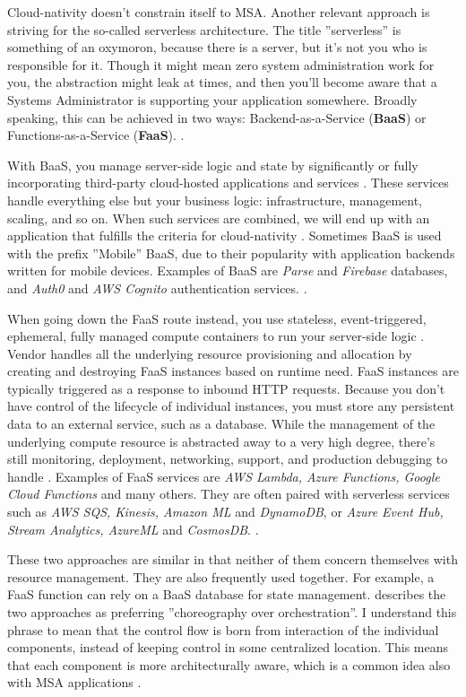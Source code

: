\documentclass[utf8,english]{gradu3}
\begin{document}
Cloud-nativity doesn't constrain itself to MSA. Another relevant approach is
striving for the so-called serverless architecture. The title
''serverless'' is something of an oxymoron, because there is a server, but it's
not you who is responsible for it. Though it might mean zero system
administration work for you, the abstraction might leak at times, and then
you'll become aware that a Systems Administrator is supporting your application
somewhere. Broadly speaking, this can be achieved in two ways:
Backend-as-a-Service (\textbf{BaaS}) or Functions-as-a-Service (\textbf{FaaS}).
\parencite{Roberts2018}.

With BaaS, you manage server-side logic and state by significantly or fully
incorporating third-party cloud-hosted applications and services
\parencite{Roberts2018}.  These services handle everything else but your
business logic: infrastructure, management, scaling, and so on. When such
services are combined, we will end up with an application that fulfills the
criteria for cloud-nativity \parencite[20]{Gannon2017}. Sometimes BaaS is used
with the prefix ''Mobile'' BaaS, due to their popularity with application
backends written for mobile devices. Examples of BaaS are \textit{Parse} and
\textit{Firebase} databases, and \textit{Auth0} and \textit{AWS Cognito}
authentication services.  \parencite{Roberts2018}.

When going down the FaaS route instead, you use stateless, event-triggered,
ephemeral, fully managed compute containers to run your server-side logic
\parencite{Roberts2018}. Vendor handles all the underlying resource provisioning
and allocation by creating and destroying FaaS instances based on runtime need.
FaaS instances are typically triggered as a response to inbound HTTP requests. Because you
don't have control of the lifecycle of individual instances, you must store any
persistent data to an external service, such as a database. While the management
of the underlying compute resource is abstracted away to a very high degree,
there's still monitoring, deployment, networking, support, and production
debugging to handle \parencite{Roberts2018}. Examples of FaaS services are
\textit{AWS Lambda, Azure Functions, Google Cloud Functions} and many others.
They are often paired with serverless services such as \textit{AWS SQS, Kinesis,
  Amazon ML} and \textit{DynamoDB}, or \textit{Azure Event Hub, Stream Analytics,
  AzureML} and \textit{CosmosDB}.  \parencite[17]{Gannon2017}.

These two approaches are similar in that neither of them concern themselves with
resource management. They are also frequently used together. For example, a FaaS
function can rely on a BaaS database for state management.
\textcite{Roberts2018} describes the two approaches as preferring ''choreography over
orchestration''. I understand this phrase to mean that the control flow is born
from interaction of the individual components, instead of keeping control in some
centralized location.  This means that each component is more
architecturally aware, which is a common idea also with MSA applications
\parencite{Roberts2018}.
\end{document}
